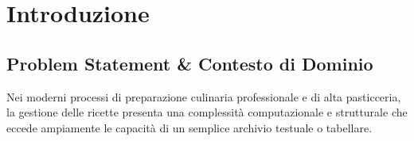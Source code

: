\documentclass[11pt,a4paper,titlepage]{article}
\begin{document}
\tableofcontents
\newpage

\section{Introduzione}
\subsection{Problem Statement \& Contesto di Dominio}
Nei moderni processi di preparazione culinaria professionale e di alta pasticceria, la gestione delle ricette presenta una complessit\`a computazionale e strutturale che eccede ampiamente le capacit\`a di un semplice archivio testuale o tabellare.
\end{document}
